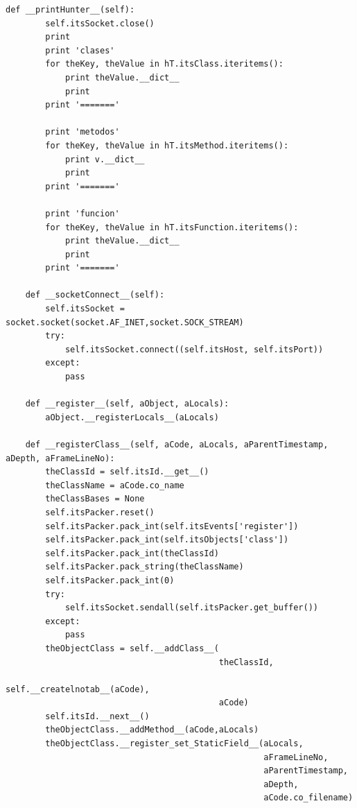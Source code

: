 \documentclass[12pt,legalpaper]{report}
\begin{document}
\begin{singlespace}
\begin{lstlisting}[style=Python]
    def __printHunter__(self):
        self.itsSocket.close()
        print
        print 'clases'
        for theKey, theValue in hT.itsClass.iteritems():
            print theValue.__dict__
            print
        print '======='
        
        print 'metodos'
        for theKey, theValue in hT.itsMethod.iteritems():
            print v.__dict__
            print
        print '======='
        
        print 'funcion'
        for theKey, theValue in hT.itsFunction.iteritems():
            print theValue.__dict__
            print
        print '======='
        
    def __socketConnect__(self):
        self.itsSocket = socket.socket(socket.AF_INET,socket.SOCK_STREAM)
        try:
            self.itsSocket.connect((self.itsHost, self.itsPort))
        except:
            pass
    
    def __register__(self, aObject, aLocals):
        aObject.__registerLocals__(aLocals)

    def __registerClass__(self, aCode, aLocals, aParentTimestamp, aDepth, aFrameLineNo):
        theClassId = self.itsId.__get__()
        theClassName = aCode.co_name
        theClassBases = None
        self.itsPacker.reset()
        self.itsPacker.pack_int(self.itsEvents['register'])
        self.itsPacker.pack_int(self.itsObjects['class'])
        self.itsPacker.pack_int(theClassId)
        self.itsPacker.pack_string(theClassName)
        self.itsPacker.pack_int(0)
        try:
            self.itsSocket.sendall(self.itsPacker.get_buffer())
        except:
            pass
        theObjectClass = self.__addClass__(
                                           theClassId,
                                           self.__createlnotab__(aCode),
                                           aCode)
        self.itsId.__next__()
        theObjectClass.__addMethod__(aCode,aLocals)
        theObjectClass.__register_set_StaticField__(aLocals,
                                                    aFrameLineNo,
                                                    aParentTimestamp,
                                                    aDepth,
                                                    aCode.co_filename)


\end{lstlisting}
\end{singlespace}
\end{document}
